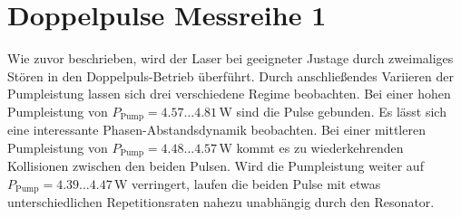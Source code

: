 \documentclass[bachelor,       %
               twoside,        %
               BCOR10mm,       %
               liststotoc,nomtotoc,bibtotoc, %
               english,ngerman, %
               final,          %
               ]{GAUBM}
\begin{document}
\section{Doppelpulse Messreihe 1}
Wie zuvor beschrieben, wird der Laser bei geeigneter Justage durch zweimaliges Stören in den Doppelpuls-Betrieb überführt.
Durch anschließendes Variieren der Pumpleistung lassen sich drei verschiedene Regime beobachten.
Bei einer hohen Pumpleistung von $P_\text{Pump}=4.57\dots 4.81\,$W sind die Pulse gebunden.
Es lässt sich eine interessante Phasen-Abstandsdynamik beobachten.
Bei einer mittleren Pumpleistung von $P_\text{Pump}=4.48\dots 4.57\,$W kommt es zu wiederkehrenden Kollisionen zwischen den beiden Pulsen.
Wird die Pumpleistung weiter auf $P_\text{Pump}=4.39\dots 4.47\,$W verringert, laufen die beiden Pulse mit etwas unterschiedlichen Repetitionsraten nahezu unabhängig durch den Resonator.

\clearpage
\end{document}
